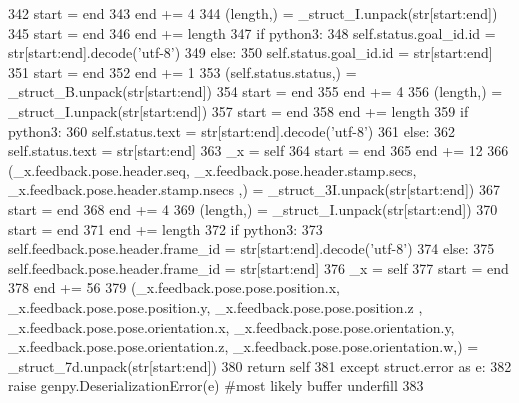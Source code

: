 \begin{DoxyCode}
342       start = end
343       end += 4
344       (length,) = \_struct\_I.unpack(str[start:end])
345       start = end
346       end += length
347       \textcolor{keywordflow}{if} python3:
348         self.status.goal\_id.id = str[start:end].decode(\textcolor{stringliteral}{'utf-8'})
349       \textcolor{keywordflow}{else}:
350         self.status.goal\_id.id = str[start:end]
351       start = end
352       end += 1
353       (self.status.status,) = \_struct\_B.unpack(str[start:end])
354       start = end
355       end += 4
356       (length,) = \_struct\_I.unpack(str[start:end])
357       start = end
358       end += length
359       \textcolor{keywordflow}{if} python3:
360         self.status.text = str[start:end].decode(\textcolor{stringliteral}{'utf-8'})
361       \textcolor{keywordflow}{else}:
362         self.status.text = str[start:end]
363       \_x = self
364       start = end
365       end += 12
366       (\_x.feedback.pose.header.seq, \_x.feedback.pose.header.stamp.secs, \_x.feedback.pose.header.stamp.nsecs
      ,) = \_struct\_3I.unpack(str[start:end])
367       start = end
368       end += 4
369       (length,) = \_struct\_I.unpack(str[start:end])
370       start = end
371       end += length
372       \textcolor{keywordflow}{if} python3:
373         self.feedback.pose.header.frame\_id = str[start:end].decode(\textcolor{stringliteral}{'utf-8'})
374       \textcolor{keywordflow}{else}:
375         self.feedback.pose.header.frame\_id = str[start:end]
376       \_x = self
377       start = end
378       end += 56
379       (\_x.feedback.pose.pose.position.x, \_x.feedback.pose.pose.position.y, \_x.feedback.pose.pose.position.z
      , \_x.feedback.pose.pose.orientation.x, \_x.feedback.pose.pose.orientation.y, 
      \_x.feedback.pose.pose.orientation.z, \_x.feedback.pose.pose.orientation.w,) = \_struct\_7d.unpack(str[start:end])
380       \textcolor{keywordflow}{return} self
381     \textcolor{keywordflow}{except} struct.error \textcolor{keyword}{as} e:
382       \textcolor{keywordflow}{raise} genpy.DeserializationError(e) \textcolor{comment}{#most likely buffer underfill}
383 
\end{DoxyCode}
